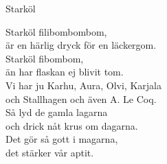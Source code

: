 \begin{song}{Starköl}
	
	
	
	Starköl filibombombom,\\
	är en härlig dryck för en läckergom.\\
	Starköl fibombom, \\
	än har flaskan ej blivit tom.\\
	Vi har ju Karhu, Aura, Olvi, Karjala\\
	och Stallhagen och även A. Le Coq.\\
	Så lyd de gamla lagarna\\
	och drick nåt krus om dagarna.\\
	Det gör så gott i magarna,\\
	det stärker vår aptit.

\end{song}
